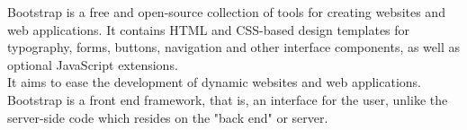 Bootstrap is a free and open-source collection of tools for creating websites and web applications. It contains HTML and CSS-based design templates for typography, forms, buttons, navigation and other interface components, as well as optional JavaScript extensions. \\
It aims to ease the development of dynamic websites and web applications.\\
Bootstrap is a front end framework, that is, an interface for the user, unlike the server-side code which resides on the "back end" or server.


